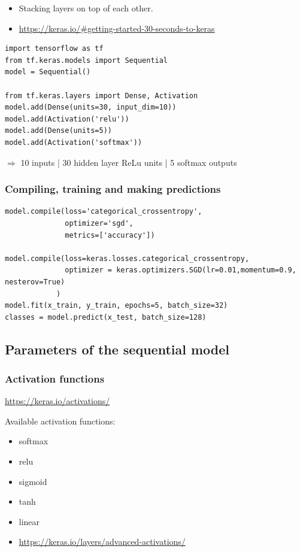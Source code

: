 \documentclass{article}
\begin{document}
\begin{itemize}
    \item Stacking layers on top of each other.
    \item \url{https://keras.io/#getting-started-30-seconds-to-keras}
\end{itemize}

\begin{verbatim}
import tensorflow as tf
from tf.keras.models import Sequential
model = Sequential()

from tf.keras.layers import Dense, Activation
model.add(Dense(units=30, input_dim=10))
model.add(Activation('relu'))
model.add(Dense(units=5))
model.add(Activation('softmax'))
\end{verbatim}

$\Rightarrow$ 10 inputs | 30 hidden layer ReLu units | 5 softmax outputs

\subsubsection{Compiling, training and making predictions}

\begin{verbatim}
model.compile(loss='categorical_crossentropy',
              optimizer='sgd',
              metrics=['accuracy'])

model.compile(loss=keras.losses.categorical_crossentropy,
              optimizer = keras.optimizers.SGD(lr=0.01,momentum=0.9, nesterov=True)
            )
model.fit(x_train, y_train, epochs=5, batch_size=32)
classes = model.predict(x_test, batch_size=128)
\end{verbatim}

\subsection{Parameters of the sequential model}

\subsubsection{Activation functions}

\url{https://keras.io/activations/}

Available activation functions:

\begin{itemize}
    \item softmax
    \item relu
    \item sigmoid
    \item tanh
    \item linear
    \item \url{https://keras.io/layers/advanced-activations/}
\end{itemize}
\end{document}
